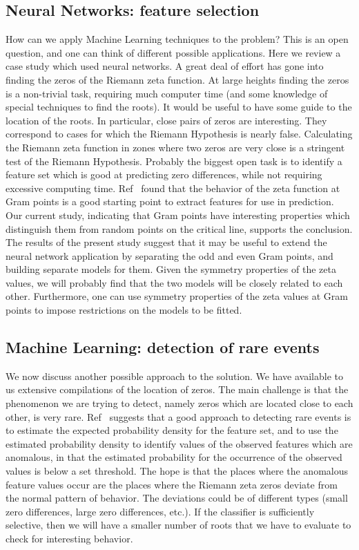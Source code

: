 \documentclass[twoside]{article}
\theoremstyle{definition}
\begin{document}
{\subsection{\label{secfeature}Neural Networks: feature selection}
How can we apply Machine Learning techniques to the problem? This is an open question, and one can think of different possible applications. Here we review a case study which used neural networks. A great deal of effort has gone into finding the zeros of the Riemann zeta function. At large heights finding the zeros is a non-trivial task, requiring much computer time (and some knowledge of special techniques to find the roots). It would be useful to have some guide to the location of the roots. In particular, close pairs of zeros are interesting. They correspond to cases for which the
Riemann Hypothesis is nearly false. Calculating the Riemann zeta function in zones where
two zeros are very close is a stringent test of the Riemann Hypothesis. Probably the biggest open task is to identify a feature set which is good at predicting zero differences, while not requiring excessive computing time. Ref~\cite{osneural} found that the behavior of the zeta function at Gram points is a good starting point to extract features for use in prediction. Our current study, indicating that Gram points have interesting properties which distinguish them from random points on the critical line, supports the conclusion. The results of the present study suggest that it may be useful to extend the neural network application by separating the odd and even Gram points, and building separate models for them. Given the symmetry properties of the zeta values, we will probably find that the two models will be closely related to each other.  Furthermore, one can use symmetry properties of the zeta values at Gram points to impose restrictions on the models to be fitted.  

\subsection{\label{secMLrare}Machine Learning: detection of rare events}

We now discuss another possible approach to the solution. We have available to us extensive compilations of the location of zeros. The main challenge is that the phenomenon we are trying to detect, namely zeros which are located close to each other, is very rare. 
Ref~\cite{Friedman(2001)} suggests that  a good approach to detecting rare events is to estimate the expected probability density for the feature set, and to use the estimated probability density to identify values of the observed features which are anomalous, in that the estimated probability for the occurrence of the observed values is below a set threshold. The hope is that the places where the anomalous feature values occur are the places where the Riemann zeta zeros deviate from the normal pattern of behavior. The deviations could be of different types (small zero differences, large zero differences, etc.). If the classifier is sufficiently selective, then we will have a smaller number of roots that we have to evaluate to check for interesting behavior. 

}
\end{document}
